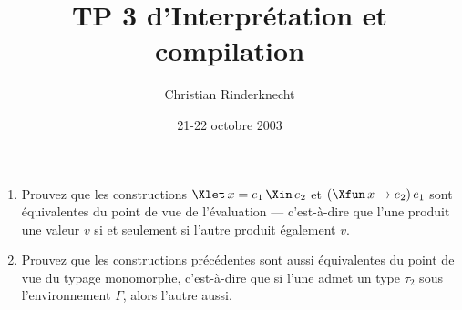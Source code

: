\documentclass[a4paper,11pt]{article}
\title{TP 3 d'Interprétation et compilation}
\author{Christian Rinderknecht}
\date{21-22 octobre 2003}
\begin{document}
\maketitle

\begin{enumerate}

  \item Prouvez que les constructions $\Xlet \, x = e_1 \,
  \Xin \, e_2$ et $(\Xfun \, x \rightarrow e_2) \, e_1$ sont
  équivalentes du point de vue de l'évaluation --- c'est-à-dire que
  l'une produit une valeur $v$ si et seulement si l'autre produit
  également $v$.

  \item Prouvez que les constructions précédentes sont aussi
  équivalentes du point de vue du typage monomorphe, c'est-à-dire que
  si l'une admet un type $\tau_2$ sous l'environnement $\Gamma$, alors
  l'autre aussi.

\end{enumerate}
\end{document}
